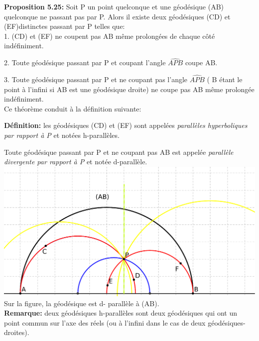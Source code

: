 \documentclass[a4paper, 12pt, twoside]{book}
\begin{document}
   \newpage \textbf{Proposition 5.25:} Soit P un point quelconque et une géodésique (AB) quelconque ne passant pas par P. Alors il existe deux géodésiques (CD) et (EF)distinctes passant par P telles que:\\
  
  
  
  1. (CD) et (EF) ne coupent pas AB même prolongées de chaque côté indéfiniment.\
  
  2. Toute géodésique passant par P et coupant l'angle $\hat{APB}$ coupe AB.\
  
  3. Toute géodésique passant par P et ne coupant pas l'angle $\hat{APB}$ ( B étant le point à l'infini si AB est une géodésique droite) ne coupe pas AB même prolongée indéfiniment.\\
  
  
  Ce théorème conduit à la définition suivante:
  
  
  
  
 
  
 
  \textbf{Définition:} les géodésiques (CD) et (EF) sont appelées \textit{parallèles hyperboliques par rapport à P} et notées h-parallèles.\
  
   Toute géodésique passant par P et ne coupant pas AB est appelée \textit{parallèle divergente par rapport à P} et notée d-parallèle.\\
   
    \includegraphics[scale=0.4]{figures/lob1.eps}\\
    
    Sur la figure, la géodésique est d- parallèle à (AB).\\
    
   
   \textbf{Remarque:} deux géodésiques h-parallèles sont deux géodésiques qui ont un point commun sur l'axe des réels (ou à l'infini dans le cas de deux géodésiques-droites).\
   
\end{document}
